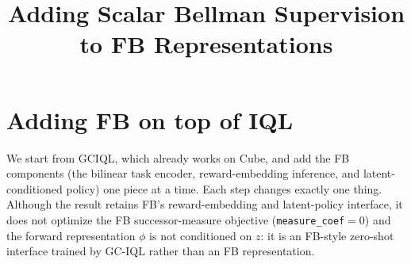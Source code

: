 \documentclass[11pt]{article}
\title{Adding Scalar Bellman Supervision to FB Representations}
\date{}
\begin{document}
\maketitle

\section{Adding FB on top of IQL}
\label{sec:rgfb}

We start from GCIQL, which already works on Cube, and add the FB components (the bilinear task encoder, reward-embedding inference, and latent-conditioned policy) one piece at a time.
Each step changes exactly one thing.
Although the result retains FB's reward-embedding and latent-policy interface, it does not optimize the FB successor-measure objective (\texttt{measure\_coef}$=0$) and the forward representation $\phi$ is not conditioned on $z$: it is an FB-style zero-shot interface trained by GC-IQL rather than an FB representation.
\end{document}
